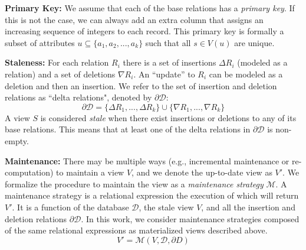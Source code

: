 \vspace{0.5em}

\noindent \textbf{Primary Key:} We assume that each of the base relations has a \emph{primary key}. If this is not the case, we can always add an extra column that assigns an increasing sequence of integers to each record. 
This primary key is formally a subset of attributes $u \subseteq \{a_1,a_2,...,a_k\}$ such that all $s \in V(u)$ are unique.

\vspace{0.5em}

\noindent \textbf{Staleness:} For each relation $R_i$ there is a set of insertions $\Delta R_i$ (modeled as a relation)
and a set of deletions $\nabla R_i$.
An ``update'' to $R_i$ can be modeled as a deletion and then an insertion.
We refer to the set of insertion and deletion relations as ``delta relations", denoted by $\partial \mathcal{D}$:
\[
	\partial \mathcal{D} = \{\Delta R_1,...,\Delta R_k\} \cup \{\nabla R_1,...,\nabla R_k\}
\]
A view $S$ is considered \emph{stale} when there exist insertions or deletions to any of its base relations.
This means that at least one of the delta relations in $\partial \mathcal{D}$ is non-empty.

\vspace{0.5em}

\noindent \textbf{Maintenance:} There may be multiple ways (e.g., incremental maintenance or re-computation) to maintain a view $V$, and we denote the up-to-date view as $V'$.
We formalize the procedure to maintain the view as a \emph{maintenance strategy} $\mathcal{M}$.
A maintenance strategy is a relational expression the execution of which will return $V'$.
It is a function of the database $\mathcal{D}$, the stale view $V$, and all the insertion and deletion relations $\partial \mathcal{D}$. 
In this work, we consider maintenance strategies composed of the same relational expressions as materialized views described above.
\[
V' = \mathcal{M}(V,\mathcal{D}, \partial D)
\]

\vspace{0.5em}

